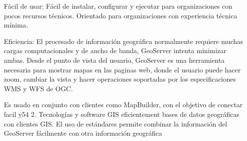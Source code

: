 Fácil de usar: Fácil de instalar, configurar y ejecutar para organizaciones con pocos recursos técnicos. Orientado para organizaciones con experiencia técnica mínima.

Eficiencia: El procesado de información geográfica normalmente requiere muchas cargas computacionales y
de ancho de banda, GeoServer intenta minimizar ambas. Desde el punto de vista del usuario, GeoServer es
una herramienta necesaria para mostrar mapas en las paginas web, donde el usuario puede hacer zoom,
cambiar la vista y hacer operaciones soportadas por los especificaciones WMS y WFS de OGC.

Es usado en conjunto con clientes como MapBuilder, con el objetivo de conectar facil y54
2. Tecnologías y software GIS eficientement bases de datos geográficas con clientes GIS. 
El uso de estándares permite combinar la información del GeoServer fácilmente con otra información 
geográfica
